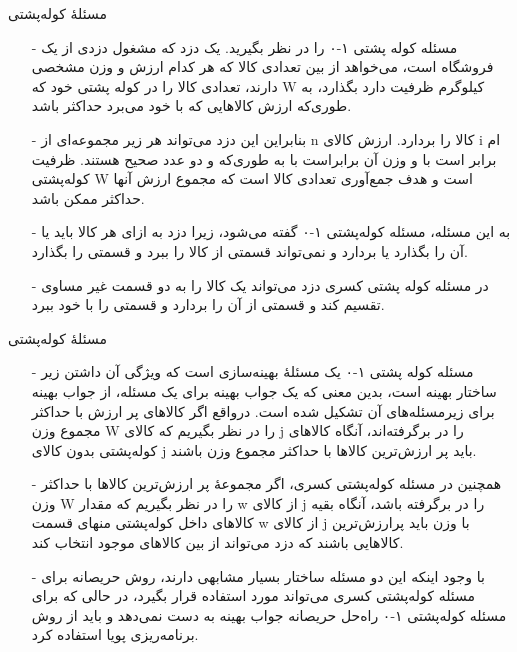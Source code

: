 \begin{frame}{مسئلهٔ کوله‌پشتی}
\begin{itemize}\itemr
\item[-]
مسئله کوله پشتی ۱-۰
را در نظر بگیرید. یک دزد که مشغول دزدی از یک فروشگاه است، می‌خواهد از بین تعدادی کالا که هر کدام ارزش و وزن مشخصی دارند، تعدادی کالا را در کوله پشتی خود که W کیلوگرم ظرفیت دارد بگذارد، به طوری‌که ارزش کالاهایی که با خود می‌برد حداکثر باشد.
\item[-]
بنابراین این دزد می‌تواند هر زیر مجموعه‌ای از n کالا را بردارد. ارزش کالای i ام برابر است با
و وزن آن برابراست با
به طوری‌که
و
دو عدد صحیح هستند. ظرفیت کوله‌پشتی W است و هدف جمع‌آوری تعدادی کالا است که مجموع ارزش آنها حداکثر ممکن باشد.
\item[-]
به این مسئله، مسئله کوله‌پشتی ۱-۰ گفته می‌شود، زیرا دزد به ازای هر کالا باید یا آن را بگذارد یا بردارد و نمی‌تواند قسمتی از کالا را ببرد و قسمتی را بگذارد.
\item[-]
در مسئله کوله پشتی کسری
 دزد می‌تواند یک کالا را به دو قسمت غیر مساوی تقسیم کند و قسمتی از آن را بردارد و قسمتی را با خود ببرد.
\end{itemize}
\end{frame}


\begin{frame}{مسئلهٔ کوله‌پشتی}
\begin{itemize}\itemr
\item[-]
مسئله کوله پشتی ۱-۰ یک مسئلهٔ بهینه‌سازی است که ویژگی آن داشتن زیر ساختار بهینه است، بدین معنی که یک جواب بهینه برای یک مسئله، از جواب بهینه برای زیرمسئله‌های آن تشکیل شده است.
درواقع اگر کالاهای پر ارزش با حداکثر مجموع وزن W را در نظر بگیریم که کالای j را در برگرفته‌اند، آنگاه کالاهای کوله‌پشتی بدون کالای j باید پر ارزش‌ترین کالاها با حداکثر مجموع وزن
باشند.
\item[-]
همچنین در مسئله کوله‌پشتی کسری، اگر مجموعهٔ پر ارزش‌ترین کالاها با حداکثر وزن W را در نظر بگیریم که مقدار w از کالای j را در برگرفته باشد، آنگاه بقیه کالاهای داخل کوله‌پشتی منهای قسمت w از کالای j با وزن
باید پرارزش‌ترین کالاهایی باشند که دزد می‌تواند از بین کالاهای موجود انتخاب کند.
\item[-]
با وجود اینکه این دو مسئله ساختار بسیار مشابهی دارند، روش حریصانه برای مسئله کوله‌پشتی کسری می‌تواند مورد استفاده قرار بگیرد،
در حالی که
 برای مسئله کوله‌پشتی ۱-۰ راه‌حل حریصانه جواب بهینه به دست نمی‌دهد و باید از روش برنامه‌ریزی پویا استفاده کرد.
\end{itemize}
\end{frame}


